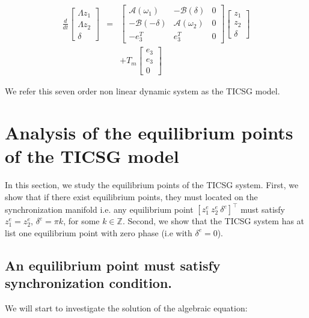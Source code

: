 \documentclass[conference]{IEEEtran}
\begin{document}
\begin{equation}
\begin{array}{ccc}
\frac{d}{dt}\left[\begin{array}{c}
\varLambda z_{1}\\
\varLambda z_{2}\\
\delta
\end{array}\right] & = & \left[\begin{array}{c|c|c}
\mathcal{A}(\omega_{1}) & -\mathcal{B}(\delta) & 0\\
\hline -\mathcal{B}(-\delta) & \mathcal{A}(\omega_{2}) & 0\\
\hline -e_{3}^{T} & e_{3}^{T} & 0
\end{array}\right]\left[\begin{array}{c}
z_{1}\\
z_{2}\\
\delta
\end{array}\right]\\
 &  & +T_{m}\left[\begin{array}{c}
e_{3}\\
e_{3}\\
0
\end{array}\right]
\end{array}\label{eq:TICSGDynamics}
\end{equation}

We refer this seven order non linear dynamic system as the TICSG model.

\section{Analysis of the equilibrium points of the TICSG model \label{sec:equivalence_pont}}

In this section, we study the equilibrium points of the TICSG system. First, we show that  if there exist equilibrium points, they must located on the synchronization manifold i.e. any equilibrium point $\left[z_1^e \ z_2^e \ \delta^e \right]^\top$ must satisfy $z_1^e=z_2^e$, $\delta^e=\pi k$, for some $k \in \mathbb{Z}$. Second, we show that the TICSG system has at list one equilibrium point with zero phase (i.e with $\delta^e=0$).

\subsection{An equilibrium point must satisfy synchronization condition.}
We will start to investigate the solution of the algebraic equation:  
\end{document}
